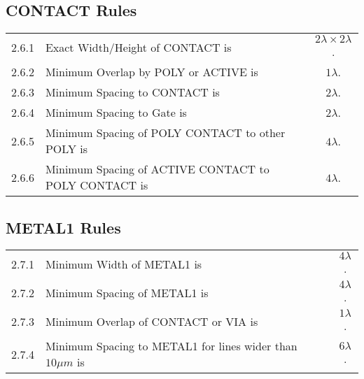 \subsection{CONTACT Rules}\label{design_rules_contact_rules}

\begin{flushleft}
    \begin{tabular}{c l c}
        2.6.1   & Exact Width/Height of CONTACT is & $ 2 \lambda \times 2 \lambda$. \\
        2.6.2   & Minimum Overlap by POLY or ACTIVE is & $1 \lambda$. \\
        2.6.3   & Minimum Spacing to CONTACT is & $2 \lambda$. \\
        2.6.4   & Minimum Spacing to Gate is & $2 \lambda$. \\
        2.6.5   & Minimum Spacing of POLY CONTACT to other POLY is & $4 \lambda$. \\
        2.6.6   & Minimum Spacing of ACTIVE CONTACT to POLY CONTACT is & $4 \lambda$. \\
    \end{tabular}
\end{flushleft}

\subsection{METAL1 Rules}\label{design_rules_metal1_rules}

\begin{center}
\end{center}

\begin{flushleft}
    \begin{tabular}{c l c}
        2.7.1   & Minimum Width of METAL1 is & $4 \lambda$. \\
        2.7.2   & Minimum Spacing of METAL1 is & $4 \lambda$. \\
        2.7.3   & Minimum Overlap of CONTACT or VIA is & $1 \lambda$. \\
        2.7.4   & Minimum Spacing to METAL1 for lines wider than $10 \mu m$ is & $6 \lambda$. \\
    \end{tabular}
\end{flushleft}

